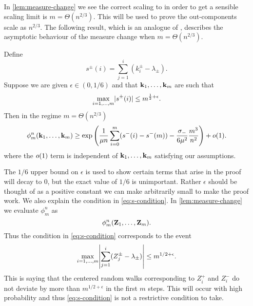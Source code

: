 In \cref{lem:measure-change} we see the correct scaling to in order to get a sensible scaling limit is $m = \Theta(n^{2/3})$. This will be used to prove the out-components scale as $n^{2/3}$. The following result, which is an analogue of \cite[Lemma 6.7]{conchon--kerjanStableGraphMetric2020}, describes the asymptotic behaviour of the measure change when $m = \Theta(n^{2/3})$.
\begin{lemma}
    \label{lem:measure-change-approx}
    Define
    \begin{equation*}
        s^{\pm}(i) = \textstyle{\sum_{j=1}^i (k_i^{\pm} - \lambda_{\pm})}.
    \end{equation*}
    Suppose we are given $\epsilon \in (0, 1/6)$ and that ${\mathbf k}_1, \ldots, {\mathbf k}_m$ are such that
    \begin{equation}
        \label{eq:s-condition}
        \max_{i=1, \ldots, m} \lvert s^{\pm}(i)\rvert \leq m^{\frac{1}{2} + \epsilon}.
    \end{equation}
    Then in the regime $m = \Theta(n^{2/3})$
    \begin{equation*}
        \phi^n_m({\mathbf k}_1, \ldots, {\mathbf k}_m)
        \geq \exp\left( \frac{1}{\mu n} \sum_{i=0}^m (s^-(i) - s^-(m)) - \frac{\sigma_-}{6 \mu^2} \frac{m^3}{n^2} \right) + o(1).
    \end{equation*}
    where the $o(1)$ term is independent of ${\mathbf k}_1, \ldots, {\mathbf k}_m$ satisfying our assumptions.
\end{lemma}
The $1/6$ upper bound on $\epsilon$ is used to show certain terms that arise in the proof will decay to 0, but the exact value of $1/6$ is unimportant. Rather $\epsilon$ should be thought of as a positive constant we can make arbitrarily small to make the proof work. We also explain the condition in \cref{eq:s-condition}. In \cref{lem:measure-change} we evaluate $\phi^n_m$ as 
\begin{equation*}
    \phi^n_m({\mathbf Z}_1, \ldots, {\mathbf Z}_m).
\end{equation*}
Thus the condition in \cref{eq:s-condition} corresponds to the event
\begin{equation*}
    \max_{i=1, \ldots, m } \abs*{
        \sum_{j=1}^i (Z^{\pm}_j - \lambda_{\pm}) 
    } \leq m^{1/2 + \epsilon}.
\end{equation*}
This is saying that the centered random walks corresponding to $Z^+_i$ and $Z^-_i$ do not deviate by more than $m^{1/2 + \epsilon}$ in the first $m$ steps. This will occur with high probability and thus \cref{eq:s-condition} is not a restrictive condition to take.

